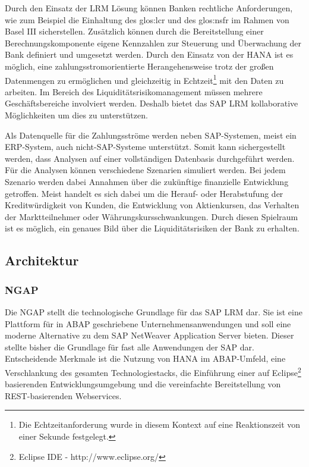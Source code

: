 \begin{onehalfspacing}
Durch den Einsatz der LRM Lösung können Banken rechtliche Anforderungen, wie zum Beispiel die Einhaltung des \gls{glos:lcr} und des \gls{glos:nsfr} im Rahmen von Basel III sicherstellen. Zusätzlich können durch die Bereitstellung einer Berechnungskomponente eigene Kennzahlen zur Steuerung und Überwachung der Bank definiert und umgesetzt werden. Durch den Einsatz von der \gls{HANA} ist es möglich, eine zahlungsstromorientierte Herangehensweise trotz der großen Datenmengen zu ermöglichen und gleichzeitig in Echtzeit\footnote{Die Echtzeitanforderung wurde in diesem Kontext auf eine Reaktionszeit von einer Sekunde festgelegt.} mit den Daten zu arbeiten. Im Bereich des Liquiditätsrisikomanagement müssen mehrere Geschäftsbereiche involviert werden. Deshalb bietet das SAP LRM kollaborative Möglichkeiten um dies zu unterstützen.

Als Datenquelle für die Zahlungsströme werden neben SAP-Systemen, meist ein \gls{ERP}-System, auch nicht-SAP-Systeme unterstützt. Somit kann sichergestellt werden, dass Analysen auf einer vollständigen Datenbasis durchgeführt werden. Für die Analysen können verschiedene Szenarien simuliert werden. Bei jedem Szenario werden dabei Annahmen über die zukünftige finanzielle Entwicklung getroffen. Meist handelt es sich dabei um die Herauf- oder Herabstufung der Kreditwürdigkeit von Kunden, die Entwicklung von Aktienkursen, das Verhalten der Marktteilnehmer oder Währungskursschwankungen. Durch diesen Spielraum ist es möglich, ein genaues Bild über die Liquiditätsrisiken der Bank zu erhalten.


\subsection{Architektur}

\subsubsection{NGAP}
Die \gls{NGAP} stellt die technologische Grundlage für das SAP LRM dar. Sie ist eine Plattform für in ABAP geschriebene Unternehmensanwendungen und soll eine moderne Alternative zu dem SAP NetWeaver Application Server bieten. Dieser stellte bisher die Grundlage für fast alle Anwendungen der SAP dar. Entscheidende Merkmale ist die Nutzung von \gls{HANA} im ABAP-Umfeld, eine Verschlankung des gesamten Technologiestacks, die Einführung einer auf Eclipse\footnote{Eclipse IDE - http://www.eclipse.org/} basierenden Entwicklungsumgebung und die vereinfachte Bereitstellung von REST-basierenden Webservices.


\end{onehalfspacing}
